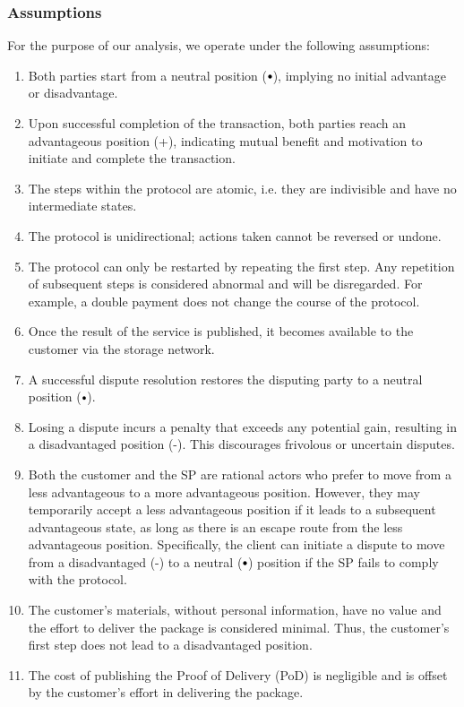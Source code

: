 \documentclass[pdftex,twocolumn,epjc3]{svjour3}
\newcommand{\plus}{+}
\newcommand{\minus}{-}
\newcommand\neutral[1][.75]{\mathbin{\ThisStyle{\vcenter{\hbox{%
  \scalebox{#1}{$\SavedStyle\bullet$}}}}}%
}
\begin{document}
\subsubsection{Assumptions}\label{sec:assumptions}

For the purpose of our analysis, we operate under the following assumptions:

\begin{enumerate}
\item Both parties start from a neutral position ($\neutral{}$), implying no initial advantage or disadvantage.
\item Upon successful completion of the transaction, both parties reach an advantageous position (\plus{}), indicating mutual benefit and motivation to initiate and complete the transaction.
\item The steps within the protocol are atomic, i.e. they are indivisible and have no intermediate states.
\item The protocol is unidirectional; actions taken cannot be reversed or undone.
\item The protocol can only be restarted by repeating the first step. Any repetition of subsequent steps is considered abnormal and will be disregarded. For example, a double payment does not change the course of the protocol.
\item Once the result of the service is published, it becomes available to the customer via the storage network.
\item A successful dispute resolution restores the disputing party to a neutral position ($\neutral{}$).
\item Losing a dispute incurs a penalty that exceeds any potential gain, resulting in a disadvantaged position (\minus{}). This discourages frivolous or uncertain disputes.
\item Both the customer and the SP are rational actors who prefer to move from a less advantageous to a more advantageous position. However, they may temporarily accept a less advantageous position if it leads to a subsequent advantageous state, as long as there is an escape route from the less advantageous position. Specifically, the client can initiate a dispute to move from a disadvantaged (\minus{}) to a neutral ($\neutral{}$) position if the SP fails to comply with the protocol.
\item The customer's materials, without personal information, have no value and the effort to deliver the package is considered minimal. Thus, the customer's first step does not lead to a disadvantaged position.
\item The cost of publishing the Proof of Delivery (PoD) is negligible and is offset by the customer's effort in delivering the package.
\end{enumerate}
\end{document}
